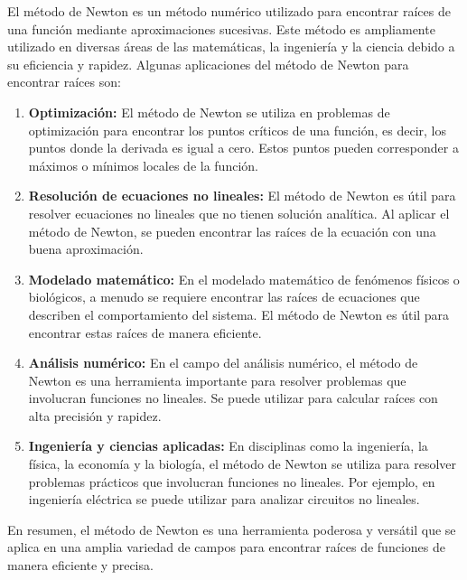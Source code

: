 El método de Newton es un método numérico utilizado para encontrar raíces de una función mediante aproximaciones sucesivas. Este método es ampliamente utilizado en diversas áreas de las matemáticas, la ingeniería y la ciencia debido a su eficiencia y rapidez. Algunas aplicaciones del método de Newton para encontrar raíces son:

\begin{enumerate}
\item \textbf{Optimización:} El método de Newton se utiliza en problemas de optimización para encontrar los puntos críticos de una función, es decir, los puntos donde la derivada es igual a cero. Estos puntos pueden corresponder a máximos o mínimos locales de la función.

\item \textbf{Resolución de ecuaciones no lineales:} El método de Newton es útil para resolver ecuaciones no lineales que no tienen solución analítica. Al aplicar el método de Newton, se pueden encontrar las raíces de la ecuación con una buena aproximación.

\item \textbf{Modelado matemático:} En el modelado matemático de fenómenos físicos o biológicos, a menudo se requiere encontrar las raíces de ecuaciones que describen el comportamiento del sistema. El método de Newton es útil para encontrar estas raíces de manera eficiente.

\item \textbf{Análisis numérico:} En el campo del análisis numérico, el método de Newton es una herramienta importante para resolver problemas que involucran funciones no lineales. Se puede utilizar para calcular raíces con alta precisión y rapidez.

\item \textbf{Ingeniería y ciencias aplicadas:} En disciplinas como la ingeniería, la física, la economía y la biología, el método de Newton se utiliza para resolver problemas prácticos que involucran funciones no lineales. Por ejemplo, en ingeniería eléctrica se puede utilizar para analizar circuitos no lineales.
\end{enumerate}

En resumen, el método de Newton es una herramienta poderosa y versátil que se aplica en una amplia variedad de campos para encontrar raíces de funciones de manera eficiente y precisa.
